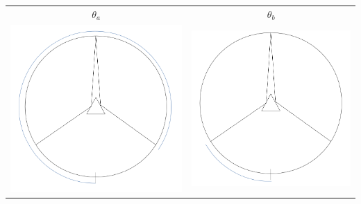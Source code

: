 \documentclass[12pt,a4paper]{article}
\begin{document}
\begin{tabular}{c c}

$\theta_a$ & $\theta_b$\\
\includegraphics[scale=.15]{a2} & \includegraphics[scale=.15]{a1}\\

\end{tabular}
\end{document}
